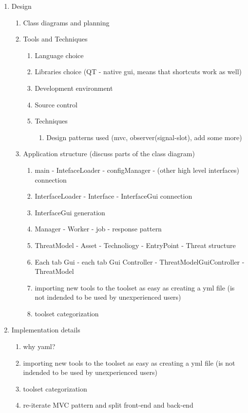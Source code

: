 \begin{enumerate}
	\item Design
	\begin{enumerate}
		\item Class diagrams and planning
			\item Tools and Techniques
			\begin{enumerate}
				\item Language choice
				\item Libraries choice (QT - native gui, means that shortcuts work as well)
				\item Development environment
				\item Source control
				\item Techniques
				\begin{enumerate}
					\item Design patterns used (mvc, observer(signal-slot), add some more)
				\end{enumerate}
			\end{enumerate}
		\item Application structure (discuss parts of the class diagram)
		\begin{enumerate}
			\item main - IntefaceLoader - configManager - (other high level interfaces) connection
			\item InterfaceLoader - Interface - InterfaceGui connection
			\item InterfaceGui generation
			\item Manager - Worker - job - response pattern
			\item ThreatModel - Asset - Technoliogy - EntryPoint - Threat structure
			\item Each tab Gui - each tab Gui Controller - ThreatModelGuiController - ThreatModel
			
			\item importing new tools to the toolset as easy as creating a yml file (is not indended to be used by unexperienced users)
			\item toolset categorization
		\end{enumerate}
			
	\end{enumerate}

	\item Implementation details
	\begin{enumerate}
		\item why yaml?
		\item importing new tools to the toolset as easy as creating a yml file (is not indended to be used by unexperienced users)
		\item toolset categorization
		\item re-iterate MVC pattern and split front-end and back-end 
		

\end{enumerate}
\end{enumerate}
